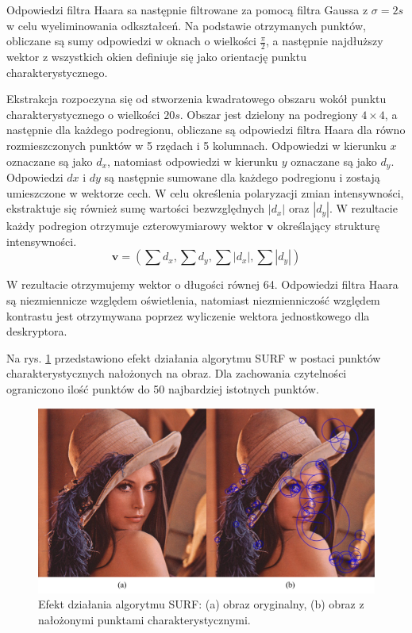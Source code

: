Odpowiedzi filtra Haara sa następnie filtrowane za pomocą filtra Gaussa z $\sigma = 2s$ w celu wyeliminowania odkształceń. Na podstawie otrzymanych punktów, obliczane są sumy odpowiedzi w oknach o wielkości $\frac{\pi}{2}$, a następnie najdłuższy wektor z wszystkich okien definiuje się jako orientację punktu charakterystycznego.

Ekstrakcja rozpoczyna się od stworzenia kwadratowego obszaru wokół punktu charakterystycznego o wielkości $20s$. Obszar jest dzielony na podregiony $4 \times 4$, a następnie dla każdego podregionu, obliczane są odpowiedzi filtra Haara dla równo rozmieszczonych punktów w 5 rzędach i 5 kolumnach. Odpowiedzi  w kierunku $x$ oznaczane są jako $d_x$, natomiast odpowiedzi w kierunku $y$ oznaczane są jako $d_y$. Odpowiedzi $dx$ i $dy$ są następnie sumowane dla każdego podregionu i zostają umieszczone w wektorze cech. W celu określenia polaryzacji zmian intensywności, ekstraktuje się również sumę wartości bezwzględnych $|d_x|$ oraz $|d_y|$. W rezultacie każdy podregion otrzymuje czterowymiarowy wektor $\boldsymbol{v}$ określający strukturę intensywności.
\begin{equation} 
\label{surf_v_vector} 
\boldsymbol{v} = (\sum{d_x}, \sum{d_y}, \sum{|d_x|}, \sum{|d_y|})
\end{equation}

W rezultacie otrzymujemy wektor o długości równej 64. Odpowiedzi filtra Haara są niezmiennicze względem oświetlenia, natomiast niezmienniczość względem kontrastu jest otrzymywana poprzez wyliczenie wektora jednostkowego dla deskryptora.

Na rys. \ref{fig:surf-keypoints} przedstawiono efekt działania algorytmu SURF w postaci punktów charakterystycznych nałożonych na obraz. Dla zachowania czytelności ograniczono ilość punktów do 50 najbardziej istotnych punktów.

\begin{figure}[h]
	\centering
	\includegraphics[scale=0.5]{graphics/01_podstawy_teoretyczne/surf-keypoints.pdf}
	\caption{ Efekt działania algorytmu SURF: (a) obraz oryginalny, (b) obraz z nałożonymi punktami charakterystycznymi. }
	\label{fig:surf-keypoints}
\end{figure}

